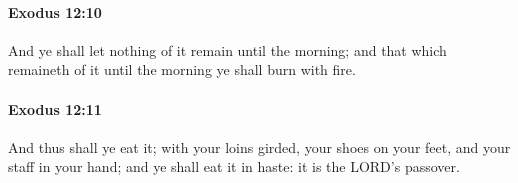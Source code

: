 		\paragraph{Exodus 12:10} %
			\label{EXODUS-12-10}

			And ye shall let nothing of it remain until the morning; and that which remaineth of it until the morning ye shall burn with fire.


		\paragraph{Exodus 12:11} %
			\label{EXODUS-12-11}

			And thus shall ye eat it; with your loins girded, your shoes on your feet, and your staff in your hand; and ye shall eat it in haste: it is the LORD's passover.


